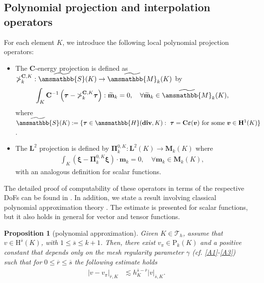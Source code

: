 \documentclass[fleqn,a4paper]{cas-sc}
\newcommand\bdiv{\mathop{\mathbf{div}}\nolimits}
\newcommand{\beps}{\boldsymbol{\varepsilon}}
\newcommand{\bC}{\mathbf{C}}
\newcommand{\bbS}{\amsmathbb{S}}
\newcommand{\bv}{\boldsymbol{v}}
\newcommand{\bm}{\mathbf{m}}
\newcommand{\bxi}{\boldsymbol{\xi}}
\newcommand{\bPi}{\boldsymbol{\Pi}}
\newcommand{\0}{\boldsymbol{0}}
\newcommand\cT{\mathcal{T}}
\newcommand\bM{\mathbf{M}}
\newcommand\rP{\mathrm{P}}
\newcommand\rH{\mathrm{H}}
\newcommand\bbH{\amsmathbb{H}}
\newcommand\bbM{\amsmathbb{M}}
\newcommand\bH{\mathbf{H}}
\newcommand\bL{\mathbf{L}}
\newcommand\bbPi{\mathbb{\Pi}}
\newcommand\btau{\boldsymbol{\tau}}
\numberwithin{equation}{section}
\numberwithin{figure}{section}
\newtheorem{proposition}[theorem]{Proposition}
\begin{document}
\subsection{Polynomial projection and interpolation operators}\label{sec:proj_inter_op} For each element $K$, we introduce the following local polynomial projection operators:
\begin{itemize}
    \item   The $\bC$-energy projection is defined as $\bbPi_{k}^{\bC,K}: \widetilde{\bbS}(K)\rightarrow \widetilde{\bbM}_k(K)$ by
            \begin{align*}%
                \int_K {\bC^{-1}\left(\btau-\bbPi_{k}^{\bC,K}\btau\right)} : \widetilde{\bm}_k = 0, \quad  %
                \forall \widetilde{\bm}_k\in \widetilde{\bbM}_k(K),
            \end{align*}
            where $\widetilde{\bbS}(K):=\{\btau\in \bbH(\bdiv,K):\ \btau= \bC\beps(\bv)\ \text{for some}\ \bv\in \bH^1(K)\}$.
    \item   The $\bL^2$ projection is defined by $\bPi_{k}^{0,K}: \bL^2(K)\rightarrow \bM_{k}(K)$ where
            \begin{align}\label{PiVector}
                \int_K \left(\bxi-\bPi_{k}^{0,K}\bxi\right)\cdot \bm_{k} = 0, \quad %
                \forall \bm_{k} \in \bM_{k}(K),
            \end{align}
            with an analogous definition for scalar functions.
\end{itemize}
The detailed proof of computability of these operators in terms of the respective DoFs can be found in \cite{artioli18,visinoni24,beirao16,beirao16b}. In addition, we state a result involving classical polynomial approximation theory \cite{brenner08}. The estimate is presented for scalar functions, but it also holds in general for vector and tensor functions.
\begin{proposition}[polynomial approximation] \label{prop:est_poly}
    Given $K\in \cT_h$, assume that $v\in  \rH^{{\overline{s}}}(K)$, with  $1 \leq {\overline{s}} \leq k+1$. Then, there exist $v_\pi \in \rP_k(K)$ and a positive constant that depends only on {the mesh regularity parameter $\gamma$} ({cf.} \ref{A1}-\ref{A3}) such that for $0\leq \overline{r}\leq {\overline{s}}$ the following estimate holds
    \begin{align*}
        |v - v_\pi|_{\overline{r},K} &\lesssim  h_K^{{\overline{s}}-\overline{r}}|v|_{{\overline{s}},K}.
    \end{align*} 
\end{proposition}
\end{document}
